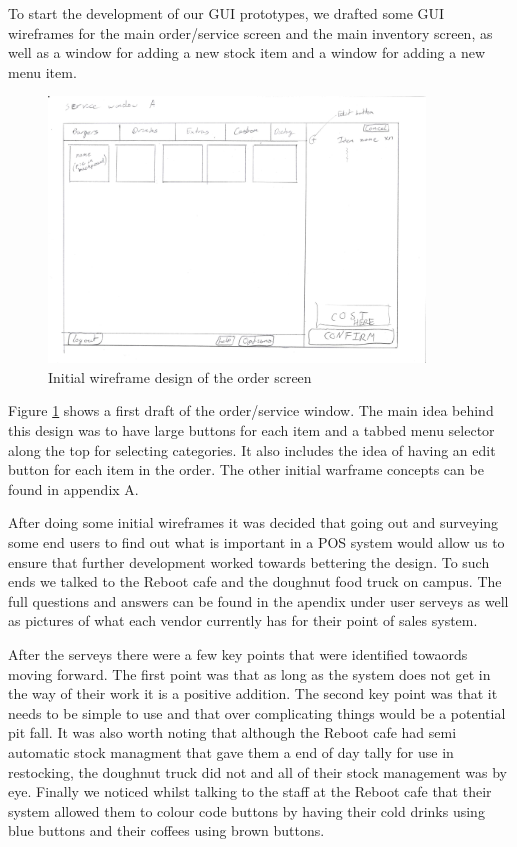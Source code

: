 To start the development of our GUI prototypes, we drafted some GUI wireframes for the main order/service screen and the main inventory screen, as well as a window for adding a new stock item and a window for adding a new menu item.

\begin{figure}[ht]
	\centering
	\includegraphics[width=100mm,angle=-90]{images/Wireframe_drafts/Service_window_A.jpg}
	\caption{Initial wireframe design of the order screen}
	\label{fig:Service_window_A}
\end{figure}

Figure \ref{fig:Service_window_A} shows a first draft of the order/service window. The main idea behind this design was to have large buttons for each item and a tabbed menu selector along the top for selecting categories. It also includes the idea of having an edit button for each item in the order. The other initial warframe concepts can be found in appendix A.

After doing some initial wireframes it was decided that going out and surveying some end users to find out what is important in a POS system would allow us to ensure that further development worked towards bettering the design. To such ends we talked to the Reboot cafe and the doughnut food truck on campus. The full questions and answers can be found in the apendix under user serveys as well as pictures of what each vendor currently has for their point of sales system.

After the serveys there were a few key points that were identified towaords moving forward. The first point was that as long as the system does not get in the way of their work it is a positive addition. The second key point was that it needs to be simple to use and that over complicating things would be a potential pit fall. It was also worth noting that although the Reboot cafe had semi automatic stock managment that gave them a end of day tally for use in restocking, the doughnut truck did not and all of their stock management was by eye. Finally we noticed whilst talking to the staff at the Reboot cafe that their system allowed them to colour code buttons by having their cold drinks using blue buttons and their coffees using brown buttons.

